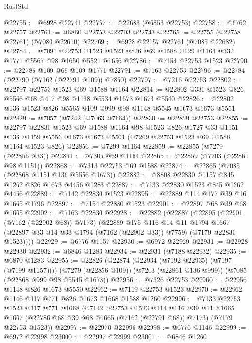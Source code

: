 \begin{lexlean}{RustStd}
\begin{coremodule}
@22755 := @6928 @22741
@22757 := @22683 (@6853 @22753)
@22758 := @6762 @22757
@22761 := @6860 @22753 @22703 @22743
@22765 := @22755 (@22758 @22761) (@7080 @22610)
@22769 := @6928 @22757 @22761 (@7085 @22682)
@22784 := @7091 @22753 @1523 @1523 @826 @69 @1588 @129 @1164 @332 @1771 @5567 @98 @1650 @5521 @1656
@22786 := @7154 @22753 @1523
@22790 := @22786 @109 @69 @109 @1771
@22791 := @7163 @22753
@22796 := @22784 (@22790 (@7162 (@22791 @109)) @7850)
@22797 := @7216 @22753
@22802 := @22797 @22753 @1523 @69 @1588 @1164
@22814 := @22802 @331 @1523 @826 @5566 @68 @417 @98 @1138 @5534 @1673 @1673 @5540
@22826 := @22802 @136 @1523 @826 @5565 @109 @999 @98 @1148 @5545 @1673 @1673 @5551
@22829 := @7057 (@7242 (@7063 @7664))
@22830 := @22829 @22753
@22855 := @22797
    @22830
    @1523
    @69
    @1588
    @1164
    @98
    @1523
    @826
    @1727
    @33
    @1151
    @136
    @1159
    @5556
    @1673
    @1673
    @5561
    (@7269 @22753 @1523 @69 @1588 @1164 @1523 @826)
@22856 := @7299 @1164
@22859 := @22855 (@7279 (@22856 @33))
@22861 := @7305 @69 @1164
@22865 := @22859 (@7203 (@22861 @98 @1151))
@22868 := @7313 @22753 @69 @1588
@22874 := @22865 (@7085 (@22868 @1151 @136 @5556 @1673))
@22882 := @8808 @22830 @1157 @845 @1262 @826 @1673 @4456 @1283
@22887 := @7133 @22830 @1523 @845 @1262 @4456
@22889 := @7142 @22830 @1523
@22895 := @22889 @114 @177 @39 @16 @1665 @1796
@22897 := @7154 @22830 @1523
@22901 := @22897 @68 @39 @68 @1665
@22902 := @7163 @22830
@22928 := @22882
    (@22887
      (@22895
        (@22901 (@7162 (@22902 @68)) @7173)
        (@22889
          @175
          @116
          @14
          @11
          @1794
          @1667
          (@22897 @33 @14 @33 @1794 (@7162 (@22902 @33)) @7759)
          (@7179 @22830 @1523))))
@22929 := @6776 @1157
@22930 := @6972 @22929
@22931 := @22928 @22930
@22932 := @6846 @1283
@22934 := @22931 (@7188 @22932)
@22935 := @6870 @1283
@22955 := @22826
    (@22874 (@22934 (@7192 @22935) (@7197 (@7199 @1157))))
    (@7279 (@22856 @109))
    (@7203 (@22861 @136 @999))
    (@7085 (@22868 @999 @98 @5545 @1673))
@22956 := @7326 @22753
@22960 := @22956 @1148 @826 @1673 @5550
@22962 := @7119 @22753 @1523
@22970 := @22962 @1146 @117 @771 @826 @1673 @1668 @1588 @1260
@22996 := @7133
    @22753
    @1523
    @117
    @771
    @1668
    (@7142
      @22753
      @1523
      @114
      @116
      @39
      @11
      @1665
      @1667
      (@22786 @68 @39 @68 @1665 (@7162 (@22791 @68)) @7173)
      (@7179 @22753 @1523))
@22997 := @22970 @22996
@22998 := @6776 @1146
@22999 := @6972 @22998
@23000 := @22997 @22999
@23001 := @6846 @1260

\end{coremodule}
\end{lexlean}
